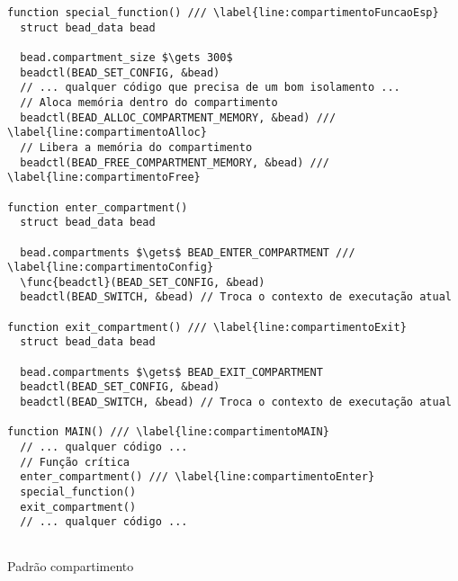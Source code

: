 
\begin{pseudocode}
\begin{lstlisting}[language=pseudocode, style=pseudocode]
function special_function() /// \label{line:compartimentoFuncaoEsp}
  struct bead_data bead

  bead.compartment_size $\gets 300$
  beadctl(BEAD_SET_CONFIG, &bead)
  // ... qualquer código que precisa de um bom isolamento ...
  // Aloca memória dentro do compartimento
  beadctl(BEAD_ALLOC_COMPARTMENT_MEMORY, &bead) /// \label{line:compartimentoAlloc}
  // Libera a memória do compartimento
  beadctl(BEAD_FREE_COMPARTMENT_MEMORY, &bead) /// \label{line:compartimentoFree}

function enter_compartment()
  struct bead_data bead

  bead.compartments $\gets$ BEAD_ENTER_COMPARTMENT /// \label{line:compartimentoConfig}
  \func{beadctl}(BEAD_SET_CONFIG, &bead)
  beadctl(BEAD_SWITCH, &bead) // Troca o contexto de executação atual

function exit_compartment() /// \label{line:compartimentoExit}
  struct bead_data bead

  bead.compartments $\gets$ BEAD_EXIT_COMPARTMENT
  beadctl(BEAD_SET_CONFIG, &bead)
  beadctl(BEAD_SWITCH, &bead) // Troca o contexto de executação atual

function MAIN() /// \label{line:compartimentoMAIN}
  // ... qualquer código ...
  // Função crítica
  enter_compartment() /// \label{line:compartimentoEnter}
  special_function()
  exit_compartment()
  // ... qualquer código ...
  
\end{lstlisting}

  \caption{Padrão compartimento}
  \label{alg:compartimento}
\end{pseudocode}
